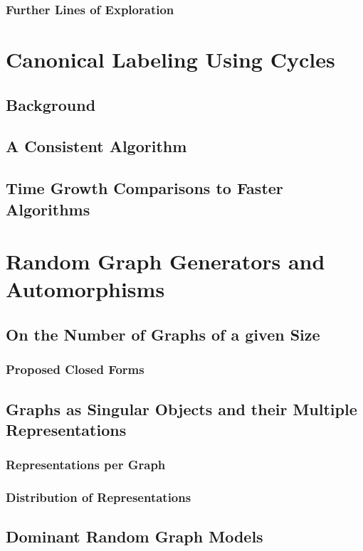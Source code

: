 \documentclass[11pt,a4paper]{report}
\begin{document}
\subsection{Further Lines of Exploration}



\chapter{Canonical Labeling Using Cycles}
\section{Background}
\section{A Consistent Algorithm}
\section{Time Growth Comparisons to Faster Algorithms}



\chapter{Random Graph Generators and Automorphisms}

\section{On the Number of Graphs of a given Size}
\subsection{Proposed Closed Forms}

\section{Graphs as Singular Objects and their Multiple Representations}
\subsection{Representations per Graph}
\subsection{Distribution of Representations}

\section{Dominant Random Graph Models}
\end{document}
